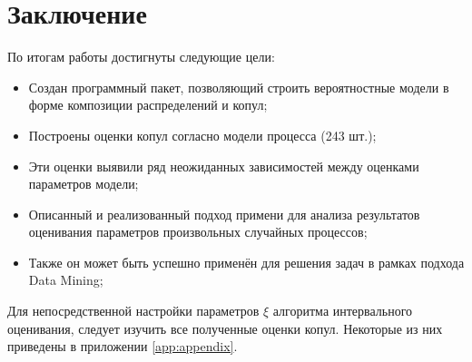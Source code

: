\chapter*{Заключение}	%

По итогам работы достигнуты следующие цели:
\begin{itemize}
  \item Создан программный пакет, позволяющий строить вероятностные модели в форме композиции распределений и копул;
  \item Построены оценки копул согласно модели процесса (243 шт.);
  \item Эти оценки выявили ряд неожиданных зависимостей между оценками параметров модели;
  \item Описанный и реализованный подход примени для анализа результатов оценивания параметров произвольных случайных процессов;
  \item Также он может быть успешно применён для решения задач в рамках подхода Data Mining;
\end{itemize}

Для непосредственной настройки параметров $\xi$ алгоритма интервального оценивания, следует изучить все полученные оценки копул. Некоторые из них приведены в приложении \ref{app:appendix}.

\clearpage